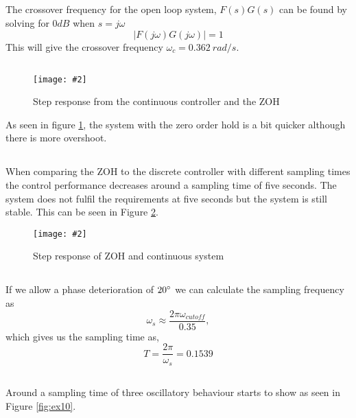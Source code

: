 \documentclass[12pt,a4paper]{article}
\newcommand{\fig}[4]{
    \begin{figure}[!h]
      \centering
      \texttt{[image: \#2]}
        \label{fig:#3}
        \caption{#4}
    \end{figure}
}
\begin{document}
  \subsection{}%
  The crossover frequency for the open loop system, $F(s)G(s)$ can be
  found by solving for $0dB$ when $s=j\omega$
  \begin{equation}
    |F(j\omega)G(j\omega)|=1
  \end{equation}
  This will give the crossover frequency $\omega_c=0.362\:rad/s$.

  \subsection{}%

  \fig{0.4}{con_zero_compare.png}{cont_zero_step}{Step response
  from the continuous controller and the ZOH}
  As seen in figure \ref{fig:cont_zero_step}, the system with the zero
  order hold is a bit quicker although there is more overshoot. 

  \subsection{}%

When comparing the ZOH to the discrete controller with different sampling times the control performance decreases around a sampling time of five seconds. The system does not fulfil the requirements at five seconds but the system is still stable. This can be seen in Figure \ref{fig:ex8}. 

	\fig{0.6}{ex8.png}{ex8}{Step response of ZOH and continuous system}

  \subsection{}%
  If we allow a phase deterioration of $20\degree$ we can calculate the
  sampling frequency as 
  \begin{equation}
    \omega_s\approx \frac{2\pi\omega_{cutoff}}{0.35},
  \end{equation}
  which gives us the sampling time as,
  \begin{equation}
    T=\frac{2\pi}{\omega_s}=0.1539
  \end{equation}

\subsection{}%
Around a sampling time of three oscillatory behaviour starts to show as seen in Figure \ref{fig:ex10}.
\end{document}
